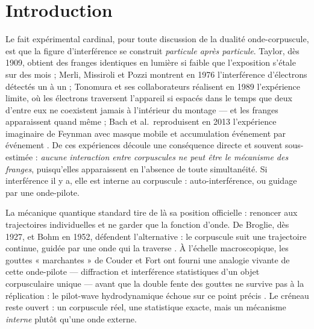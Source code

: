 \documentclass[11pt,a4paper]{article}
\begin{document}
\section{Introduction}\label{sec:intro}

Le fait expérimental cardinal, pour toute discussion de la dualité onde-corpuscule,
est que la figure d'interférence se construit \emph{particule après particule}.
Taylor, dès 1909, obtient des franges identiques en lumière si faible que
l'exposition s'étale sur des mois \cite{taylor1909} ; Merli, Missiroli et Pozzi
montrent en 1976 l'interférence d'électrons détectés un à un \cite{merli1976} ;
Tonomura et ses collaborateurs réalisent en 1989 l'expérience limite, où les
électrons traversent l'appareil si espacés dans le temps que deux d'entre eux ne
coexistent jamais à l'intérieur du montage --- et les franges apparaissent quand
même \cite{tonomura1989} ; Bach et al.\ reproduisent en 2013 l'expérience imaginaire
de Feynman avec masque mobile et accumulation événement par événement
\cite{bach2013}. De ces expériences découle une conséquence directe et souvent
sous-estimée : \emph{aucune interaction entre corpuscules ne peut être le mécanisme
des franges}, puisqu'elles apparaissent en l'absence de toute simultanéité. Si
interférence il y a, elle est interne au corpuscule : auto-interférence, ou
guidage par une onde-pilote.

La mécanique quantique standard tire de là sa position officielle : renoncer aux
trajectoires individuelles et ne garder que la fonction d'onde. De Broglie, dès
1927, et Bohm en 1952, défendent l'alternative : le corpuscule suit une trajectoire
continue, guidée par une onde qui la traverse \cite{debroglie1927,bohm1952}. À
l'échelle macroscopique, les gouttes « marchantes » de Couder et Fort ont fourni
une analogie vivante de cette onde-pilote --- diffraction et interférence statistiques
d'un objet corpusculaire unique \cite{couder2006,eddi2009} --- avant que la double
fente des gouttes ne survive pas à la réplication : le pilot-wave hydrodynamique
échoue sur ce point précis \cite{andersen2014,bush2015}. Le créneau reste ouvert :
un corpuscule réel, une statistique exacte, mais un mécanisme \emph{interne} plutôt
qu'une onde externe.
\end{document}

